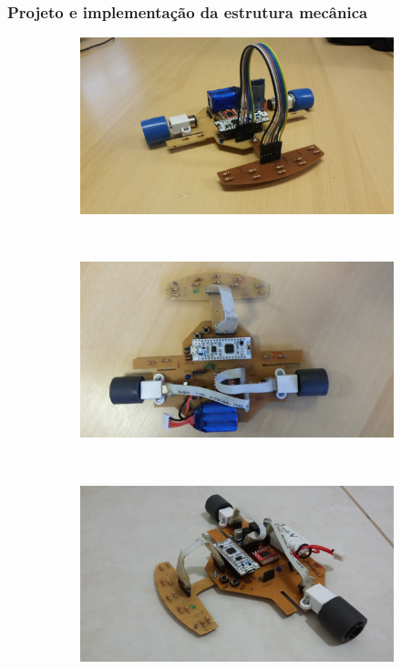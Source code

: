 \begin{frame}
\frametitle{Projeto e implementação da estrutura mecânica}
\begin{figure}[h]
     \centering
     \captionsetup{width=0.8\textwidth,font=footnotesize,textfont=bf}
     \begin{subfigure}[b]{0.3\textwidth}
 	\centering
         \includegraphics[width=\textwidth,height=\textheight,keepaspectratio]{figuras/crazy1.jpg}
         \caption{\centering}
     \end{subfigure}
     ~
     \pause
     \begin{subfigure}[b]{0.3\textwidth}
 	\centering
         \includegraphics[width=\textwidth,height=5\textheight,keepaspectratio]{figuras/crazy2.jpg}
         \caption{\centering }
     \end{subfigure}
     ~
     \pause
     \begin{subfigure}[b]{0.3\textwidth}
 	\centering
         \includegraphics[width=\textwidth,height=5\textheight,keepaspectratio]{figuras/crazy3.jpg}

\end{subfigure}
\end{figure}
\end{frame}

